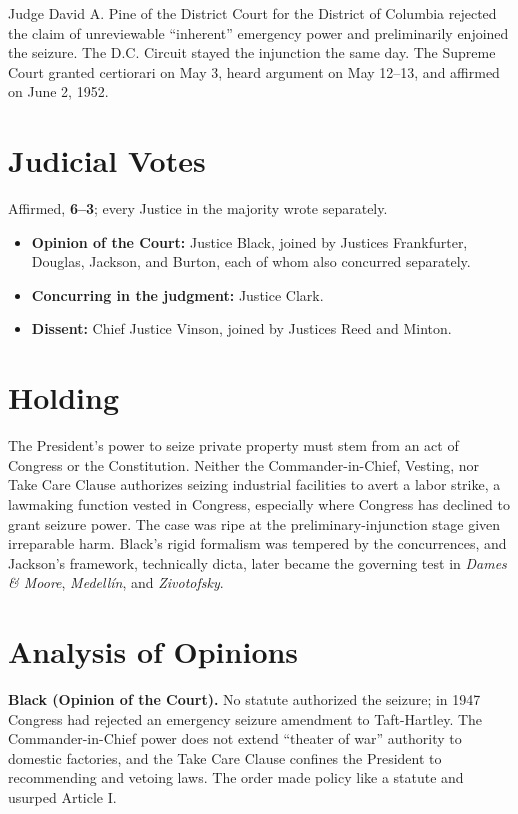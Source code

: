\documentclass[12pt]{article}
\begin{document}
Judge David A. Pine of the District Court for the District of Columbia rejected the claim of unreviewable ``inherent'' emergency power and preliminarily enjoined the seizure. The D.C. Circuit stayed the injunction the same day. The Supreme Court granted certiorari on May 3, heard argument on May 12--13, and affirmed on June 2, 1952.

\section{Judicial Votes}

Affirmed, \textbf{6--3}; every Justice in the majority wrote separately.
\begin{itemize}
\item \textbf{Opinion of the Court:} Justice Black, joined by Justices Frankfurter, Douglas, Jackson, and Burton, each of whom also concurred separately.
\item \textbf{Concurring in the judgment:} Justice Clark.
\item \textbf{Dissent:} Chief Justice Vinson, joined by Justices Reed and Minton.
\end{itemize}

\section{Holding}

The President's power to seize private property must stem from an act of Congress or the Constitution. Neither the Commander-in-Chief, Vesting, nor Take Care Clause authorizes seizing industrial facilities to avert a labor strike, a lawmaking function vested in Congress, especially where Congress has declined to grant seizure power. The case was ripe at the preliminary-injunction stage given irreparable harm. Black's rigid formalism was tempered by the concurrences, and Jackson's framework, technically dicta, later became the governing test in \textit{Dames \& Moore}, \textit{Medell\'{i}n}, and \textit{Zivotofsky}.

\section{Analysis of Opinions}

\textbf{Black (Opinion of the Court).} No statute authorized the seizure; in 1947 Congress had rejected an emergency seizure amendment to Taft-Hartley. The Commander-in-Chief power does not extend ``theater of war'' authority to domestic factories, and the Take Care Clause confines the President to recommending and vetoing laws. The order made policy like a statute and usurped Article I.
\end{document}
